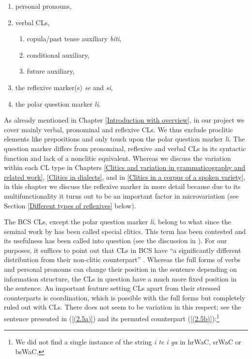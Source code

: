 \begin{enumerate}
	\item	personal pronouns,
	\item	verbal CLs, 
	\begin{enumerate}
		\item	copula/past tense auxiliary \textit{biti},
		\item	conditional auxiliary,
		\item	future auxiliary,
	\end{enumerate}
	\item	the reflexive marker(s) \textit{se} and \textit{si},
	\item	the polar question marker \textit{li}.
\end{enumerate}

As already mentioned in Chapter \ref{Introduction with overview}, in our project we cover mainly verbal, pronominal and reflexive CLs. We thus exclude proclitic elements like prepositions and only touch upon the polar question marker \textit{li}. The question marker differs from pronominal, reflexive and verbal CLs in its syntactic function and lack of a nonclitic equivalent. Whereas we discuss the variation within each CL type in Chapters \ref{Clitics and variation in grammaticography and related work}, \ref{Clitics in dialects}, and in \ref{Clitics in a corpus of a spoken variety}, in this chapter we discuss the reflexive marker in more detail because due to its multifunctionality it turns out to be an important factor in microvariation (see Section \ref{Different types of reflexives} below). 

The BCS CLs, except the polar question marker \textit{li}, belong to what since the seminal work by \citet{Zwicky77} has been called special clitics. This term has been contested and its usefulness has been called into question (see the discussion in \citealt[41--45]{SpencerLuis12}). For our purposes, it suffices to point out that CLs in BCS have ``a significantly different distribution from their non-clitic counterpart'' \citep[6]{FranksKing00}. Whereas the full forms of verbs and personal pronouns can change their position in the sentence depending on information structure, the CLs in question have a much more fixed position in the sentence. An important feature setting CLs apart from their stressed counterparts is coordination, which is possible with the full forms but completely ruled out with CLs. There does not seem to be variation in this respect; see the sentence presented in (\ref{(2.5a)}) and its permuted counterpart (\ref{(2.5b)}):\footnote{We did not find a single instance of the string \textit{i te i ga} in hrWaC, srWaC or bsWaC.}


